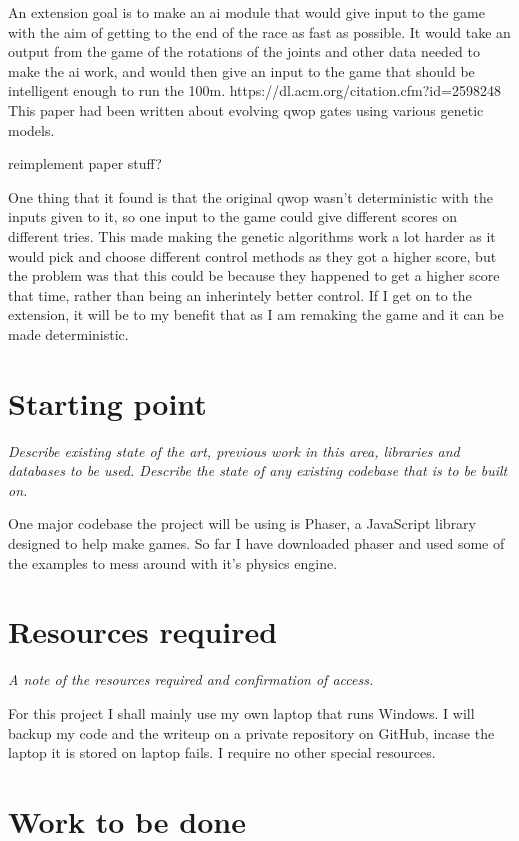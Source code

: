 \documentclass[12pt,a4paper,twoside]{article}
\begin{document}
 An extension goal is to make an ai module that would give input to the game with the aim of getting to the end of the race as fast as possible. It would take an output from the game of the rotations of the joints and other data needed to make the ai work, and would then give an input to the game that should be intelligent enough to run the 100m.
 https://dl.acm.org/citation.cfm?id=2598248 This paper had been written about evolving qwop gates using various genetic models.

reimplement paper stuff?

One thing that it found is that the original qwop wasn't deterministic with the inputs given to it, so one input to the game could give different scores on different tries. This made making the genetic algorithms work a lot harder as it would pick and choose different control methods as they got a higher score, but the problem was that this could be because they happened to get a higher score that time, rather than being an inherintely better control. If I get on to the extension, it will be to my benefit that as I am remaking the game and it can be made deterministic.

\section*{Starting point}

\emph{Describe existing state of the art, previous work in this area, libraries and databases to be used. Describe the state of any existing codebase that is to be built on.}

One major codebase the project will be using is Phaser, a JavaScript library designed to help make games. So far I have downloaded phaser and used some of the examples to mess around with it's physics engine.

\section*{Resources required}

\emph{A note of the resources required and confirmation of access.}

For this project I shall mainly use my own laptop that runs Windows. I will backup my code and the writeup on a private repository on GitHub, incase the laptop it is stored on laptop fails. I require no other special resources.

\section*{Work to be done}
\end{document}
